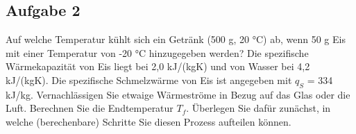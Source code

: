 \documentclass[a4paper,11pt]{article}
\newif\ifshowme
\begin{document}
\subsection*{Aufgabe 2}
Auf welche Temperatur kühlt sich ein Getränk (500 g, 20 °C) ab, wenn 50 g Eis mit einer
Temperatur von -20 °C hinzugegeben werden? Die spezifische Wärmekapazität von Eis liegt
bei 2,0 kJ/(kgK) und von Wasser bei 4,2 kJ/(kgK). Die spezifische Schmelzwärme von Eis ist angegeben mit $q_S$ = 334 kJ/kg. Vernachlässigen Sie etwaige Wärmeströme in Bezug auf das
Glas oder die Luft. \pp
Berechnen Sie die Endtemperatur $T_f$. Überlegen Sie dafür zunächst, in welche (berechenbare) Schritte Sie diesen Prozess aufteilen können.


\ifshowme
\antwort{
Zunächst Energie des Eiswürfels ausrechnen (wir gehen davon aus, dass er schmelzen wird)


\begin{align*}
Q &= m \cdot c \cdot \Delta T \\ 
Q &= 0,05 ~\text{kg} \cdot 2 ~\text{kJ/kg} \cdot 20 ~\text{K} + 0,05 \cdot 334 ~\text{kJ/kg} \\ 
Q &= 18,7 ~\text{kJ} 
\end{align*}

Im nächsten Schritt schauen wir uns an, wie sehr wie die Temperatur unseres Getränkes mit der Energie aus dem Eiswürfel absenken können:

\begin{align*}
Q &= m \cdot c \cdot \Delta T \qquad \rightarrow \qquad \Delta T = \frac{Q}{m \cdot c} \\ \\
\Delta T &= \frac{18,7 ~\text{kJ}}{0,5 ~\text{kg} \cdot 4,2 ~\text{kJ/kgK}} \\ 
		&= 8,9 ~\text{°C}
\end{align*}

Wir wissen nun, dass unser Getränk eine Temperatur von 11,1°C (20-8,9 °C) und unsere Flüssigkeit, die ehemals Eiswürfel war, eine Temperatur von 0°C hat. Wenn zwei Flüssigkeiten mit unterschiedlichen Temperaturen gemischt werden, gilt für die Endtemperatur: 


\begin{align*}
T_f &= \frac{c_1 \cdot m_1 \cdot T_1 + c_2 \cdot m_2 \cdot T_2}{c_1 \cdot m_1 + c_2 \cdot m_2} \\
T_f &= \frac{m_1 \cdot T_1 + m_2 \cdot T_2}{m_1 + m_2} \\
T_f &= \frac{0,5~\text{kg} \cdot 11,1 ~\text{°C} + 0,05~\text{kg} \cdot 0 ~\text{°C}}{0,5 ~\text{kg} + 0,05 ~\text{kg}} \\
	&= 10,09 ~\text{°C}
\end{align*}

}
\pagebreak
\else
\fi
\end{document}
